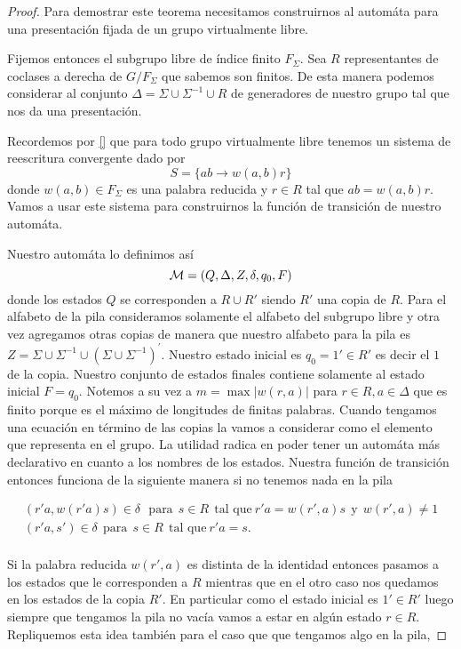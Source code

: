 \documentclass[tesis.tex]{subfiles}
\begin{document}
\begin{proof}
	Para demostrar este teorema necesitamos construirnos al automáta para una presentación fijada de un grupo virtualmente libre.
	
	Fijemos entonces el subgrupo libre de índice finito $F_\Sigma$. Sea $R$ representantes de coclases a derecha de $G/F_\Sigma$ que sabemos son finitos. De esta manera podemos considerar al conjunto  $\Delta = \Sigma \cup \Sigma^{-1} \cup R$ de generadores de nuestro grupo tal que nos da una presentación.
	
	Recordemos por \ref{} que para todo grupo virtualmente libre tenemos un sistema de reescritura convergente dado por 
	\[
	S = \{ ab \to w(a,b)r  \}
	\] 
	donde $w(a,b) \in F_\Sigma$ es una palabra reducida y $r \in R$ tal que $ab = w(a,b)r$. Vamos a usar este sistema para construirnos la función de transición de nuestro automáta. 
	
	Nuestro automáta lo definimos así 
	\[
	{\cal M }= (Q,\Delta, Z, \delta, q_0, F)
	\]
	donde los estados $Q$ se corresponden a $R \cup R'$ siendo $R'$ una copia de $R$. Para el alfabeto de la pila consideramos solamente el alfabeto del subgrupo libre y otra vez agregamos otras copias de manera que nuestro alfabeto para la pila es $Z = \Sigma \cup \Sigma^{-1} \cup (\Sigma \cup \Sigma^{-1})^{'}$. Nuestro estado inicial es $q_0 = 1' \in R'$ es decir el $1$ de la copia. Nuestro conjunto de estados finales contiene solamente al estado inicial $F=q_0$. Notemos a su vez a $m = \max {|w(r,a)|}$ para $r \in R, a \in \Delta$ que es finito porque es el máximo de longitudes de finitas palabras. Cuando tengamos una ecuación en término de las copias la vamos a considerar como el elemento que representa en el grupo. La utilidad radica en poder tener un automáta más declarativo en cuanto a los nombres de los estados. Nuestra función de transición entonces funciona de la siguiente manera si no tenemos nada en la pila
	
	\begin{align*}
		(r'a,w(r'a)s) \in \delta  \ \ \ \text{para} \ \  s \in R \ \ \text{tal que} \ r'a=w(r',a)s \ \ \text{y} \ \ w(r',a) \neq 1  \\
		(r'a,s') \in \delta  \ \ \text{para} \ \  s \in R \ \ \text{tal que} \ r'a=s.  \\ 
	\end{align*}
	
Si la palabra reducida $w(r',a)$ es distinta de la identidad entonces pasamos a los estados que le corresponden a $R$ mientras que en el otro caso nos quedamos en los estados de la copia $R'$. En particular como el estado inicial es $1' \in R'$ luego siempre que tengamos la pila no vacía vamos a estar en algún estado $r \in R$. Repliquemos esta idea también para el caso que que tengamos algo en la pila,
	

\end{proof}
\end{document}
